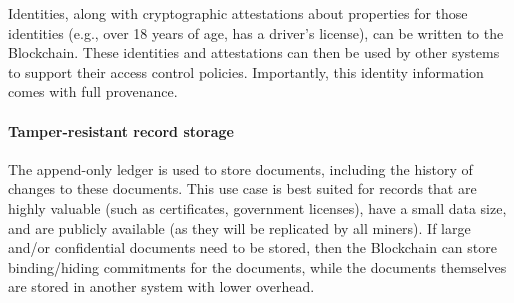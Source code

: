 Identities, along with cryptographic attestations about properties for those identities (e.g., over 18 years of age, has a driver's license), can be written to the Blockchain.
These identities and attestations can then be used by other systems to support their access control policies.
Importantly, this identity information comes with full provenance.

%


\paragraph{Tamper-resistant record storage}
The append-only ledger is used to store documents, including the history of changes to these documents.
This use case is best suited for records that are highly valuable (such as certificates, government licenses), have a small data size, and are publicly available (as they will be replicated by all miners).
If large and/or confidential documents need to be stored, then the Blockchain can store binding/hiding commitments for the documents, while the documents themselves are stored in another system with lower overhead.


